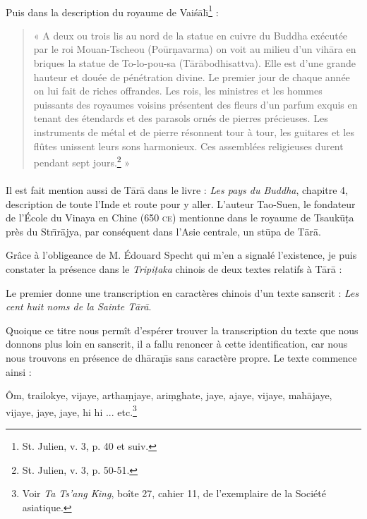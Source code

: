 \documentclass[a4paper, 11pt, oneside, french, landscape, twocolumn]{article}
\begin{document}
\paragraph{}
Puis dans la description du royaume de Vai\'{s}\={a}l\={\i}\footnote{St. Julien, v. 3, p. 40 et suiv.} :
\begin{quotation}\footnotesize
« A deux ou trois lis au nord de la statue en cuivre du Buddha exécutée par le roi Mouan-Tscheou (Po\={u}r\d{n}avarma) on voit au milieu d'un vih\={a}ra en briques la statue de To-lo-pou-sa (T\={a}r\={a}bodhisattva). Elle est d'une grande hauteur et douée de pénétration divine. Le premier jour de chaque année on lui fait de riches offrandes. Les rois, les ministres et les hommes puissants des royaumes voisins présentent des fleurs d'un parfum exquis en tenant des étendards et des parasols ornés de pierres précieuses. Les instruments de métal et de pierre résonnent tour à tour, les guitares et les flûtes unissent leurs sons harmonieux. Ces assemblées religieuses durent pendant sept jours.\footnote{St. Julien, v. 3, p. 50-51.} »
\end{quotation}
\paragraph{}
Il est fait mention aussi de T\={a}r\={a} dans le livre : \emph{Les pays du Buddha}, chapitre 4, description de toute l'Inde et route pour y aller. L'auteur Tao-Suen, le fondateur de l'École du Vinaya en Chine (650 \textsc{ce}) mentionne dans le royaume de Tsauk\={u}\d{t}a près du Str\={\i}r\={a}jya, par conséquent dans l'Asie centrale, un st\={u}pa de T\={a}r\={a}.

Grâce à l'obligeance de M. Édouard Specht qui m'en a signalé l'existence, je puis constater la présence dans le \emph{Tripi\d{t}aka} chinois de deux textes relatifs à T\={a}r\={a} :

Le premier donne une transcription en caractères chinois d'un texte sanscrit : \emph{Les cent huit noms de la Sainte T\={a}r\={a}}.

Quoique ce titre nous permît d'espérer trouver la transcription du texte que nous donnons plus loin en sanscrit, il a fallu renoncer à cette identification, car nous nous trouvons en présence de dh\={a}ra\d{n}\={\i}s sans caractère propre. Le texte commence ainsi :

Ôm, trailokye, vijaye, artha\d{m}jaye, ari\d{m}ghate, jaye, ajaye, vijaye, mah\={a}jaye, vijaye, jaye, jaye, hi hi ... etc.\footnote{Voir \emph{Ta Ts'ang King}, boîte 27, cahier 11, de l'exemplaire de la Société asiatique.}
\end{document}
